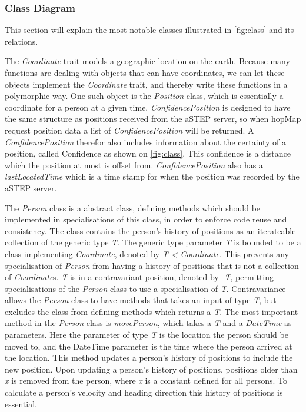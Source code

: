 \subsubsection{Class Diagram}

This section will explain the most notable classes illustrated in \cref{fig:class} and its relations.

The \emph{Coordinate} trait models a geographic location on the earth. Because many functions are dealing with objects that can have coordinates, we can let these objects implement the \emph{Coordinate} trait, and thereby write these functions in a polymorphic way. One such object is the \emph{Position} class, which is essentially a coordinate for a person at a given time. \emph{ConfidencePosition} is designed to have the same structure as positions received from the aSTEP server, so when hopMap request position data a list of \emph{ConfidencePosition} will be returned. A \emph{ConfidencePosition} therefor also includes information about the certainty of a position, called Confidence as shown on \cref{fig:class}. This confidence is a distance which the position at most is offset from. \emph{ConfidencePosition} also has a \emph{lastLocatedTime} which is a time stamp for when the position was recorded by the aSTEP server.


The \emph{Person} class is a abstract class, defining methods which should be implemented in specialisations of this class, in order to enforce code reuse and consistency. The class contains the person's history of positions as an iterateable collection of the generic type \emph{T}. The generic type parameter \emph{T} is bounded to be a class implementing \emph{Coordinate}, denoted by \emph{T < Coordinate}. This prevents any specialisation of \emph{Person} from having a history of positions that is not a collection of \emph{Coordinate}s. \emph{T} is in a contravariant position, denoted by \emph{-T}, permitting specialisations of the \emph{Person} class to use a specialisation of \emph{T}. Contravariance allows the \emph{Person} class to have methods that takes an input of type \emph{T}, but excludes the class from defining methods which returns a \emph{T}. The most important method in the \emph{Person} class is \emph{movePerson}, which takes a \emph{T} and a \emph{DateTime} as parameters. Here the parameter of type \emph{T} is the location the person should be moved to, and the DateTime parameter is the time where the person arrived at the location. This method updates a person's history of positions to include the new position. Upon updating a person's history of positions, positions older than \emph{x} is removed from the person, where \emph{x} is a constant defined for all persons. To calculate a person's velocity and heading direction this history of positions is essential. 


